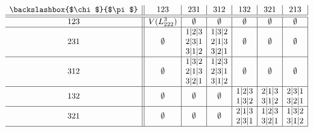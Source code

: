 \documentclass[12pt,a4paper]{amsart}
\theoremstyle{definition} %
\theoremstyle{plain} %
\begin{document}
    \begin{table}[h]
        \[
        \begin{array}{c||c|c|c|c|c|c|}
            \text{\backslashbox{$\chi$}{$\pi$}} & 123 & 231 & 312 & 132 & 321 & 213 \\ \hline \hline 
            123 & V(L^3_{222}) & \emptyset & \emptyset & \emptyset & \emptyset & \emptyset \\ \hline
            231 & \emptyset & \begin{tabular}{@{}c@{}}1|2|3 \\ 2|3|1 \\ 3|1|2 \end{tabular} & \begin{tabular}{@{}c@{}}1|3|2 \\ 2|1|3 \\ 3|2|1 \end{tabular} & \emptyset & \emptyset & \emptyset \\ \hline
            312 & \emptyset & \begin{tabular}{@{}c@{}}1|3|2 \\ 2|1|3 \\ 3|2|1 \end{tabular} & \begin{tabular}{@{}c@{}}1|2|3 \\ 2|3|1 \\ 3|1|2 \end{tabular} & \emptyset & \emptyset & \emptyset \\ \hline
            132 & \emptyset & \emptyset & \emptyset & \begin{tabular}{@{}c@{}}1|2|3 \\ 1|3|2 \end{tabular} & \begin{tabular}{@{}c@{}}2|1|3 \\ 3|1|2 \end{tabular} & \begin{tabular}{@{}c@{}}2|3|1 \\ 3|2|1 \end{tabular} \\ \hline
            321 & \emptyset & \emptyset & \emptyset & \begin{tabular}{@{}c@{}}2|1|3 \\ 2|3|1 \end{tabular} & \begin{tabular}{@{}c@{}}1|2|3 \\ 3|2|1 \end{tabular} & \begin{tabular}{@{}c@{}}1|3|2 \\ 3|1|2 \end{tabular} \\ \hline

\end{array}\]
\end{table}
\end{document}
